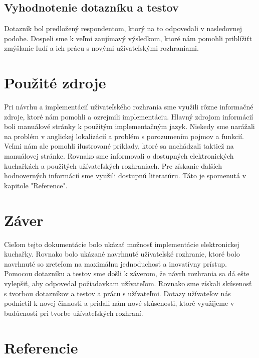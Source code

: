 \documentclass[12pt,a4paper,titlepage,final]{article}
\begin{document}
\subsection{Vyhodnotenie dotazníku a testov}

Dotazník bol predložený respondentom, ktorý na to odpovedali v nasledovnej podobe. Dospeli sme k veľmi zaujímavý výsledkom, ktoré nám pomohli priblížiťt zmýšlanie ľudí a ich prácu s novými užívateľskými rozhraniami.

\section{Použité zdroje}
Pri návrhu a implementácií užívateľského rozhrania sme využili rôzne informačné zdroje, ktoré nám pomohli a ozrejmili implementáciu. Hlavný zdrojom informácií boli manuálové stránky k použitým implementačným jazyk. Niekedy sme narážali na problém v anglickej lokalizácií a problém s porozumením pojmov a funkcií. Veľmi nám ale pomohli ilustrované príklady, ktoré sa nachádzali taktiež na manuálovej stránke. Rovnako sme informovali o dostupných elektronických kuchařkách a použitých užívateľských rozhraniach. Pre získanie ďalších hodnoverných informácií sme využili dostupnú literatúru. Táto je spomenutá v kapitole "Reference".

\section{Záver}
Cieľom tejto dokumentácie bolo ukázať možnosť implementácie elektronickej kuchařky. Rovnako bolo ukázané navrhnuté užívateľské rozhranie, ktoré bolo navrhnuté so zreteľom na maximálnu jednoduchosť a inovatívny prístup. Pomocou dotazníku a testov sme došli k záverom, že návrh rozhrania sa dá ešte vylepšiť, aby odpovedal požiadavkam užívateľom. Rovnako sme získali skúsenosť s tvorbou dotazníkov a testov a prácu s užívateľmi. Dotazy užívateľov nás podnietil k novej činnosti a pridali nám nové skúsenosti, ktoré využijeme v budúcnosti pri tvorbe užívateľských rozhraní.
\newpage

\section{Referencie}





\end{document}
